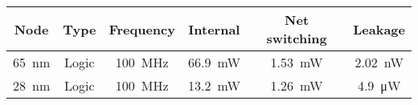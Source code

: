 \begin{table}[h]
  \begin{minipage}{1\textwidth}
    \centering
    \begin{minipage}{0.65\textwidth}
        \begin{adjustbox}{width=1\textwidth}
            \footnotesize
            \begin{tabular}{ |c|c|c|c|c|c|  }
              \hline
          Node  &   Type & Frequency                              & Internal                & Net switching           & Leakage                  \\
              \hline
          \SI{65}{\nano\meter}  &  Logic &\SI[per-mode=symbol]{100}{\mega\hertz}  & \SI{66.9}{\milli\watt} & \SI{1.53}{\milli\watt} & \SI{2.02}{\nano\watt}  \\  %
          \SI{28}{\nano\meter}  &  Logic &\SI[per-mode=symbol]{100}{\mega\hertz}  & \SI{13.2}{\milli\watt} & \SI{1.26}{\milli\watt} & \SI{4.9 }{\micro\watt} \\  %
              \hline
            \end{tabular}
        \end{adjustbox}
      \label{tab:Scaling}
    \end{minipage}
    \begin{minipage}{0.65\textwidth}
        \vspace{5mm}
        \begin{adjustbox}{width=1\textwidth}
            \footnotesize
            \begin{tabular}{ |c|c|c|c|c|c|  }
              \hline

\end{tabular}
\end{adjustbox}
\end{minipage}
\end{minipage}
\end{table}
